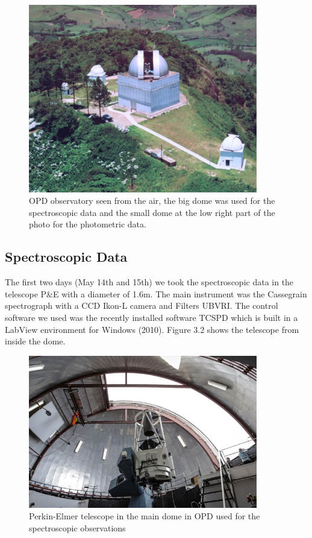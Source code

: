 \begin{figure}[H]
\centering
\includegraphics[width=10cm]{images/opd.jpg}
\caption[OPD Observatory]{OPD observatory seen from the air, the big dome was used for the spectroscopic data and the small dome at the low right part of the photo for the photometric data.}
\end{figure}

\subsection{Spectroscopic Data}

The first two days (May 14th and 15th) we took the spectroscopic data in the telescope P\&E with a diameter of 1.6m. The main instrument was the Cassegrain spectrograph with a CCD Ikon-L camera and Filters UBVRI. The control software we used was the recently installed software TCSPD which is built in a LabView environment for Windows (2010). Figure 3.2 shows the telescope from inside the dome.

\begin{figure}[H]
\centering
\includegraphics[width=10cm]{images/opd-spectrograph.jpg}
\caption[Perkin-Elmer telescope used for Spectroscopy]{Perkin-Elmer telescope in the main dome in OPD used for the spectroscopic observations}
\end{figure}

